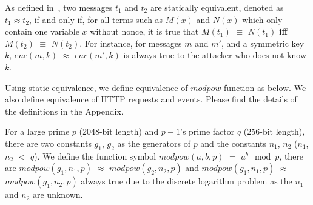  As defined in~\cite{SPRESSO}, two messages $t_1$ and $t_2$ are statically equivalent, denoted as $t_1 \approx t_2$, if and only if, for all terms such as $M(x)$ and $N(x)$ which only contain one variable $x$ without nonce, it is true that $M(t_1)$ $\equiv$ $N(t_1)$ \textbf{iff} $M(t_2)$ $\equiv$ $N(t_2)$. For instance, for messages $m$ and $m'$, and a symmetric key $k$, $enc(m, k)$ $\approx$ $enc(m', k)$ is always true to the attacker who does not know $k$.

Using static equivalence, we define equivalence of $modpow$ function as below. We also define equivalence of HTTP requests and events. Please find the details of the definitions in the Appendix.
\begin{definition}
For a large prime $p$ (2048-bit length) and $p-1$'s prime factor $q$ (256-bit length), there are two constants $g_1$, $g_2$ as the generators of $p$ and the constants $n_1$, $n_2$ ($n_1$, $n_2$ $<$ $q$). We define the function symbol $modpow(a, b, p)$ $=$ $a^b \mod p$, there are $modpow(g_1, n_1, p)$ $\approx$ $modpow(g_2, n_2, p)$ and  $modpow(g_1, n_1, p)$ $\approx$ $modpow(g_1, n_2, p)$  always true due to the discrete logarithm problem as the $n_1$ and $n_2$ are unknown.
\label{def:powequ}
\end{definition}
